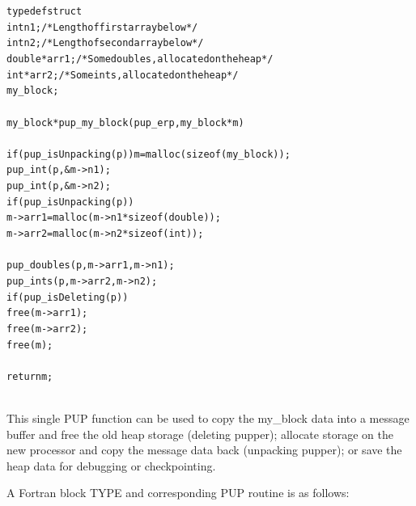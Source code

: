 \documentclass[11pt]{article}
\begin{document}
\begin{alltt}
     typedef struct {\\
       int n1;/*Length of first array below*/\\
       int n2;/*Length of second array below*/\\
       double *arr1; /*Some doubles, allocated on the heap*/\\
       int *arr2; /*Some ints, allocated on the heap*/\\
     } my\_block;\\
 \\
     my\_block *pup\_my\_block(pup\_er p,my\_block *m)\\
     {\\
       if (pup\_isUnpacking(p)) m=malloc(sizeof(my\_block));\\
       pup\_int(p,\&m->n1);\\
       pup\_int(p,\&m->n2);\\
       if (pup\_isUnpacking(p)) {\\
         m->arr1=malloc(m->n1*sizeof(double));\\
         m->arr2=malloc(m->n2*sizeof(int));\\
       }\\
       pup\_doubles(p,m->arr1,m->n1);\\
       pup\_ints(p,m->arr2,m->n2);\\
       if (pup\_isDeleting(p)) {\\
         free(m->arr1);\\
         free(m->arr2);\\
         free(m);\\
       }\\
       return m;\\
     }\\
\end{alltt}

This single PUP function can be used to copy the my\_block data into a
message buffer and free the old heap storage (deleting pupper); allocate
storage on the new processor and copy the message data back (unpacking
pupper); or save the heap data for debugging or checkpointing.

A Fortran block TYPE and corresponding PUP routine is as follows:
\end{document}

